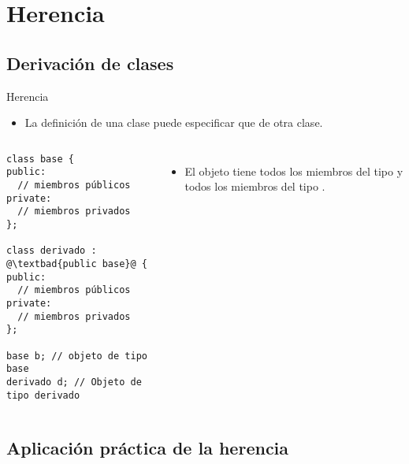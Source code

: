 \section{Herencia}

\subsection{Derivación de clases}

\begin{frame}[t,fragile]{Herencia}
\begin{itemize}
  \item La definición de una clase puede especificar que 
         de otra clase.
\end{itemize}

\begin{columns}[T]

\begin{lstlisting}[escapechar=@]
class base {
public:
  // miembros públicos
private:
  // miembros privados
};

class derivado : @\textbad{public base}@ {
public:
  // miembros públicos
private:
  // miembros privados
};

base b; // objeto de tipo base
derivado d; // Objeto de tipo derivado
\end{lstlisting}

\begin{itemize}
  \item El objeto  tiene todos los miembros del tipo 
        y todos los miembros del tipo .
\end{itemize}
\end{columns}

\end{frame}

\subsection{Aplicación práctica de la herencia}

